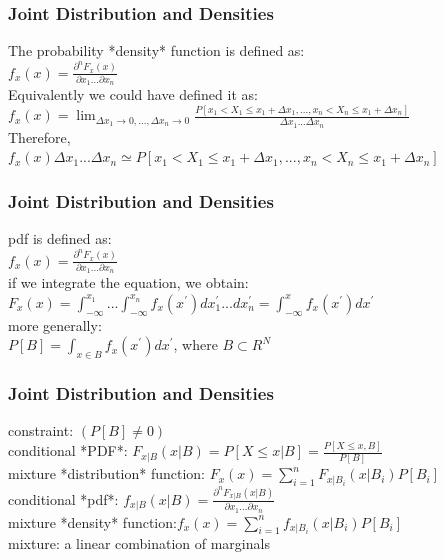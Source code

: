 \documentclass{beamer}
\begin{document}
\begin{frame}
\frametitle{Joint Distribution and Densities}
The probability *density* function is defined as:\newline\\
$f_x(x) = \frac{\partial^n{F_x(x)}}{\partial{x_1}...\partial{x_n}}$\newline\\
Equivalently we could have defined it as:\newline\\
$f_x(x) = {\lim_{\Delta x_1 \to 0,...,\Delta x_n \to 0} \frac{P[x_1<X_1\le x_1+\Delta x_1,...,x_n<X_n\le x_1+\Delta x_n]}{\Delta x_1...\Delta x_n}}$\newline\\
Therefore, \newline\\
$f_x(x) \Delta x_1...\Delta x_n \simeq {P[x_1<X_1\le x_1+\Delta x_1,...,x_n<X_n\le x_1+\Delta x_n]}$\newline\\
\end{frame}

\begin{frame}
\frametitle{Joint Distribution and Densities}
pdf is defined as:\newline\\
$f_x(x) = \frac{\partial^n{F_x(x)}}{\partial{x_1}...\partial{x_n}}$\newline\\
if we integrate the equation, we obtain:\newline\\
$F_x(x) = \int_{-\infty}^{x_1}...\int_{-\infty}^{x_n} f_x(x^{'})dx_1^{'}...dx_n^{'} = \int_{-\infty}^{x} f_x(x^{'})dx^{'}$\newline\\
more generally:\newline\\
$P [B] = \int_{x \in B} f_x(x^{'})dx^{'} $, where $B \subset R^N$
\end{frame}

\begin{frame}
\frametitle{Joint Distribution and Densities}
constraint: $(P[B]\neq 0)$\newline\\
conditional *PDF*: $F_{x|B}(x|B) = P[X\le x|B] = \frac{P[X\le x,B]}{P[B]}$  \newline\\

mixture *distribution* function: $F_x(x) = \sum _{i=1}^{n} F_{x|B_i}(x|B_i)P[B_i]$ \newline\\
conditional *pdf*: $f_{x|B}(x|B)=\frac{\partial^n{F_{x|B}(x|B)}}{\partial{x_1}...\partial{x_n}}$ \newline\\
mixture *density* function:$f_x(x) =\sum _{i=1}^{n} f_{x|B_i}(x|B_i)P[B_i]$\newline\\
mixture: a linear combination of marginals
\end{frame}
\end{document}

